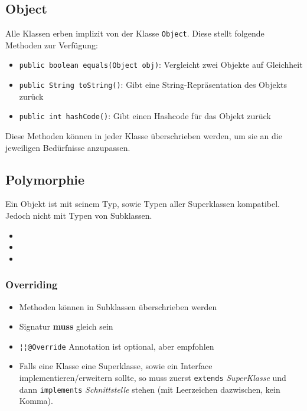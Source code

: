 \subsection{Object}
Alle Klassen erben implizit von der Klasse \lstinline{Object}. Diese stellt folgende Methoden zur Verfügung:
\begin{itemize}
    \item \lstinline{public boolean equals(Object obj)}: Vergleicht zwei Objekte auf Gleichheit
    \item \lstinline{public String toString()}: Gibt eine String-Repräsentation des Objekts zurück
    \item \lstinline{public int hashCode()}: Gibt einen Hashcode für das Objekt zurück
\end{itemize}
Diese Methoden können in jeder Klasse überschrieben werden, um sie an die jeweiligen Bedürfnisse anzupassen.

\subsection{Polymorphie}

\begin{minipage}[t]{0.65\columnwidth}
    Ein Objekt ist mit seinem Typ, sowie Typen aller Superklassen kompatibel. Jedoch nicht mit Typen von Subklassen.
\end{minipage}\hfill%
\begin{minipage}[t]{0.34\columnwidth}
    \begin{itemize}
        \item {}
        \item {}
        \item {}
    \end{itemize}
\end{minipage}

\subsubsection{Overriding}
\vspace{-0.7\abovedisplayskip}
\begin{minipage}[t]{0.5\columnwidth}
    
\end{minipage}
\begin{minipage}[t]{0.49\columnwidth}
    
\end{minipage}
\begin{itemize}
    \item Methoden können in Subklassen überschrieben werden
    \item Signatur \textbf{muss} gleich sein
    \item \lstinline{¦¦@Override} Annotation ist optional, aber empfohlen
    \item Falls eine Klasse eine Superklasse, sowie ein Interface implementieren/erweitern sollte, so muss zuerst \lstinline{extends} \textit{SuperKlasse} und dann \lstinline{implements} \textit{Schnittstelle} stehen (mit Leerzeichen dazwischen, kein Komma).
\end{itemize}
